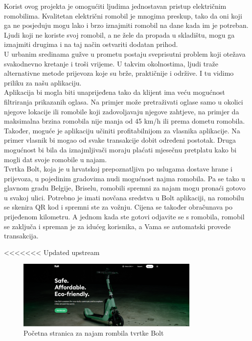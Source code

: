 		\indent Korist ovog projekta je omogućiti ljudima jednostavan pristup električnim romobilima. Kvalitetan električni romobil je mnogima preskup, tako da oni koji ga ne posjeduju mogu lako i brzo iznajmiti romobil na dane kada im je potreban. Ljudi koji ne koriste svoj romobil, a ne žele da propada u skladištu, mogu ga iznajmiti drugima i na taj način ostvariti dodatan prihod. \\
		\indent U urbanim sredinama gužve u prometu postaju sveprisutni problem koji otežava svakodnevno kretanje i troši vrijeme. U takvim okolnostima, ljudi traže alternativne metode prijevoza koje su brže, praktičnije i održive. I tu vidimo priliku za našu aplikaciju.\\
		
		\indent Aplikacija bi mogla biti unaprijeđena tako da klijent ima veću mogućnost filtriranja prikazanih oglasa. Na primjer može pretraživati oglase samo u okolici njegove lokacije ili romobile koji zadovoljavaju njegove zahtjeve, na primjer da maksimalna brzina romobila nije manja od 45 km/h ili prema dometu romobila. Također, moguće je aplikaciju učiniti profitabilnijom za vlasnika aplikacije.
		Na primer vlasnik bi mogao od svake transakcije dobit određeni postotak. Druga mogućnost bi bila da iznajmljivači moraju plaćati mjesečnu pretplatu kako bi mogli dat svoje romobile u najam. \\
		
		\indent Tvrtka Bolt, koja je u hrvatskoj prepoznatljiva po uslugama dostave hrane i prijevoza, u pojedinim gradovima nudi mogućnost najma romobila. Pa se tako u glavnom gradu Belgije, Briselu, romobili spremni za najam mogu pronaći gotovo u svakoj ulici. Potrebno je imati novčana sredstva u Bolt aplikaciji, na romobilu se skenira QR kod i spremni ste za vožnju. Cijena se također obračunava po prijeđenom kilometru. A jednom kada ste gotovi odjavite se s romobila, romobil se zaključa i spreman je za idućeg korisnika, a Vama se 	automatski provede transakcija.
		
<<<<<<< Updated upstream
		
		\begin{figure}[h]
			\centering
			\includegraphics[width=0.8\textwidth]{slike/bolt-1.png}
			\caption{Početna stranica za najam rombila tvrtke Bolt}
			\label{fig:bolt-1}
		\end{figure}
		
